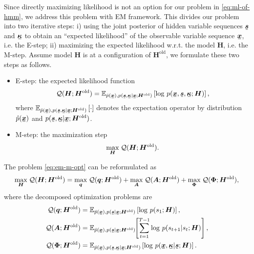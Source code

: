 Since directly maximizing likelihood is not an option for our problem in \eqref{eq:ml-of-hmm}, we address this problem with EM framework. This divides our problem into  two iterative steps: i) using the joint posterior of hidden variable sequences $\ubm{s}$ and $\ubm{\kappa}$ to obtain an ``expected likelihood'' of the observable variable sequence $\ubm{x}$, i.e. the E-step; ii) maximizing the expected likelihood w.r.t. the model $\bm{H}$, i.e. the M-step. Assume model $\bm{H}$ is at a configuration of $\bm{H}^{\mathrm{old}}$, we formulate these two steps as follows.
\begin{itemize}
\item E-step: %
  the expected likelihood function
  \begin{equation}\label{eq:em-q-funciton}
    \Qq(\bm{H}; \bm{H}^{\mathrm{old}}) = \EE_{\hat{p}(\ubm{x}),p(\ubm{s},\ubm{\kappa}| \ubm{x}; \bm{H}^{\mathrm{old}})}\left[ \log\,p(\ubm{x}, \ubm{s}, \ubm{\kappa}; \bm{H})\right],
  \end{equation}
  where $\EE_{\hat{p}(\ubm{x}),p(\ubm{s},\ubm{\kappa}| \ubm{x}; \bm{H}^{\mathrm{old}})}\left[ \cdot\right]$ denotes the expectation operator by distribution $\hat{p}(\ubm{x})$ and $p(\ubm{s},\ubm{\kappa}| \ubm{x}; \bm{H}^{\mathrm{old}})$.
\item M-step: the maximization step
  \begin{equation}\label{eq:em-m-opt}
    \underset{\bm{H}}{\max}\; \mathcal{Q}(\bm{H}; \bm{H}^{\mathrm{old}}).
  \end{equation}
\end{itemize}


The problem \eqref{eq:em-m-opt} can be reformulated as
\begin{align}\label{eq:m-step-subs}
  \underset{\bm{H}}{\max}\; \mathcal{Q}(\bm{H}; \bm{H}^{\mathrm{old}})
  =\underset{\bm{q}}{\max}\;\mathcal{Q}(\bm{q}; \bm{H}^{\mathrm{old}}) + \underset{\bm{A}}{\max}\;\mathcal{Q}(\bm{A}; \bm{H}^{\mathrm{old}}) 
     + \underset{\bm{\Phi}}{\max}\;\mathcal{Q}(\bm{\Phi}; \bm{H}^{\mathrm{old}}),
\end{align}
where the decomposed optimization problems are
\begin{align}
  \Qq(\bm{q}; \bm{H}^{\mathrm{old}}) 
    &= \EE_{\hat{p}(\ubm{x}),p(\ubm{s}| \ubm{x}; \bm{H}^{\mathrm{old}})} \left[ \log\,p({s}_{1};\bm{H})  \right], \label{eq:init-distribution-update}\\
  \Qq(\bm{A}; \bm{H}^{\mathrm{old}}) &=\EE_{\hat{p}(\ubm{x}),p(\ubm{s}| \ubm{x}; \bm{H}^{\mathrm{old}})}\hspace{-0.1cm}\left[ \sum_{t=1}^{T-1}\log\,p({s}_{t+1}|{s}_{t}; \bm{H}) \right], \label{eq:transition-update}\\
  \Qq(\bm{\Phi}; \bm{H}^{\mathrm{old}}) &= \EE_{\hat{p}(\ubm{x}),p(\ubm{s},\ubm{\kappa}| \ubm{x}; \bm{H}^{\mathrm{old}})} \left[ \log\,p(\ubm{x}, \ubm{\kappa}| \ubm{s}; \bm{H}) \right]. \label{eq:generative-model-update}
\end{align}

